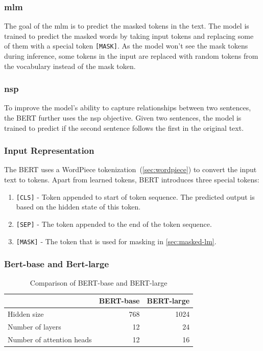 \subsubsection{\acl{mlm}}
\label{sec:masked-lm}
The goal of the \ac{mlm} is to predict the masked tokens in the text.
The model is trained to predict the masked words by taking input tokens and replacing some of them with a special token \verb|[MASK]|.
As the model won't see the mask tokens during inference, some tokens in the input are replaced with random tokens from the vocabulary instead of the mask token.

\subsubsection{\acl{nsp}}
To improve the model's ability to capture relationships between two sentences,
the BERT further uses the \acf{nsp} objective.
Given two sentences, the model is trained to predict if the second sentence follows the first in the original text.

\subsubsection{Input Representation}
The BERT uses a WordPiece tokenization~(\autoref{sec:wordpiece}) to convert the input text to tokens.
Apart from learned tokens, BERT introduces three special tokens:
\begin{enumerate}
    \item \verb|[CLS]| - Token appended to start of token sequence. The predicted output is based on the hidden state of this token.
    \item \verb|[SEP]| - The token appended to the end of the token sequence.
    \item \verb|[MASK]| - The token that is used for masking in \autoref{sec:masked-lm}.
\end{enumerate}


\subsubsection{Bert-base and Bert-large}
\begin{table}[h]
    \centering\footnotesize\sf
    \begin{tabular}{lrr}
        \toprule
        {}                        & BERT-base & BERT-large \\
        \midrule
        Hidden size               & 768       & 1024       \\
        Number of layers          & 12        & 24         \\
        Number of attention heads & 12        & 16         \\
        \bottomrule
    \end{tabular}
    \caption{Comparison of BERT-base and BERT-large}
    \label{tab:bert-base-large}
\end{table}

